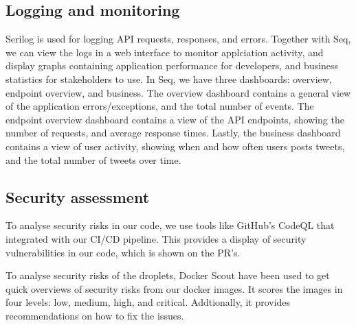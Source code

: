 \subsection{Logging and monitoring}
Serilog is used for logging API requests, responses, and errors.
Together with Seq, we can view the logs in a web interface to monitor 
applciation activity, and display graphs containing application performance 
for developers, and business statistics for stakeholders to use.
In Seq, we have three dashboards: overview, endpoint overview, and business.
The overview dashboard contains a general view of the application 
errors/exceptions, and the total number of events.
The endpoint overview dashboard contains a view of the API endpoints,
showing the number of requests, and average response times.
Lastly, the business dashboard contains a view of user activity,
showing when and how often users posts tweets, and the total number of tweets over time.


\subsection{Security assessment}
To analyse security risks in our code, we use tools like GitHub's CodeQL\cite{codeql} that 
integrated with our CI/CD pipeline.
This provides a display of security vulnerabilities in our code,
which is shown on the PR's.

To analyse security risks of the droplets, Docker Scout have been used to get
quick overviews of security risks from our docker images.
It scores the images in four levels: low, medium, high, and critical.
Addtionally, it provides recommendations on how to fix the issues.


